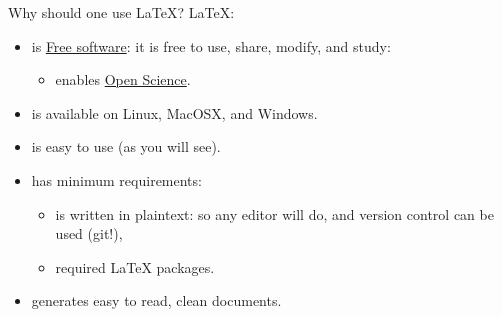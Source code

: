 \documentclass[usenames,dvipsnames]{beamer}
\begin{document}
\begin{frame}[c]{Why should one use \LaTeX{}?}
  \LaTeX{}:
  \begin{itemize}
    \item is \href{https://u.fsf.org/user-liberation}{Free software}: it is free to use, share, modify, and study:
      \begin{itemize}
        \item enables \href{https://en.wikipedia.org/wiki/Open_science}{Open Science}.
      \end{itemize}
      \pause{}
    \item is available on Linux, MacOSX, and Windows.
      \pause{}
    \item is easy to use (as you will see).
      \pause{}
    \item has minimum requirements:
      \begin{itemize}
        \item is written in \alert{plaintext}: so \alert{any} editor will do, and \alert{version control} can be used (git!),
        \item required \LaTeX{} packages.
      \end{itemize}
      \pause{}
    \item generates easy to read, clean documents\footnotemark.
  \end{itemize}
\end{frame}
\end{document}

